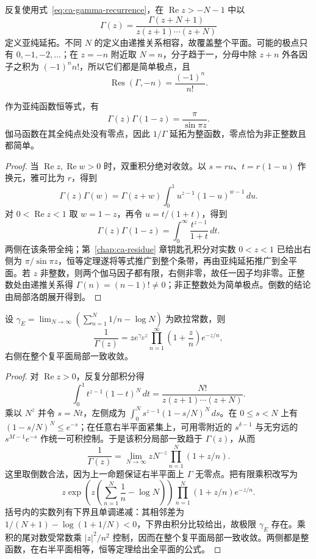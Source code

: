 反复使用式~\eqref{eq:ca-gamma-recurrence}，在 $\operatorname{Re}z>-N-1$ 中以
\[
 \Gamma(z)=\frac{\Gamma(z+N+1)}{z(z+1)\cdots(z+N)}
\]
定义亚纯延拓。不同 $N$ 的定义由递推关系相容，故覆盖整个平面。可能的极点只有 $0,-1,-2,\ldots$；在 $z=-n$ 附近取 $N=n$，分子趋于一，分母中除 $z+n$ 外各因子之积为 $(-1)^n n!$，所以它们都是简单极点，且
\begin{equation}
 \operatorname{Res}(\Gamma,-n)=\frac{(-1)^n}{n!}.
 \label{eq:ca-gamma-residues}
\end{equation}

\begin{proposition}[反射公式与无零点性]
\label{prop:ca-gamma-reflection}
作为亚纯函数恒等式，有
\begin{equation}
 \Gamma(z)\Gamma(1-z)=\frac{\pi}{\sin\pi z}.
 \label{eq:ca-gamma-reflection}
\end{equation}
伽马函数在其全纯点处没有零点，因此 $1/\Gamma$ 延拓为整函数，零点恰为非正整数且都简单。
\end{proposition}
\begin{proof}
当 $\operatorname{Re}z,\operatorname{Re}w>0$ 时，双重积分绝对收敛。以 $s=ru$、$t=r(1-u)$ 作换元，雅可比为 $r$，得到
\[
 \Gamma(z)\Gamma(w)=\Gamma(z+w)
 \int_0^1u^{z-1}(1-u)^{w-1}\,du.
\]
对 $0<\operatorname{Re}z<1$ 取 $w=1-z$，再令 $u=t/(1+t)$，得到
\[
 \Gamma(z)\Gamma(1-z)=\int_0^\infty\frac{t^{z-1}}{1+t}\,dt.
\]
两侧在该条带全纯；第~\ref{chap:ca-residue} 章钥匙孔积分对实数 $0<z<1$ 已给出右侧为 $\pi/\sin\pi z$，恒等定理遂将等式推广到整个条带，再由亚纯延拓推广到全平面。若 $z$ 非整数，则两个伽马因子都有限，右侧非零，故任一因子均非零。正整数处由递推关系得 $\Gamma(n)=(n-1)!\ne0$；非正整数处为简单极点。倒数的结论由局部洛朗展开得到。
\end{proof}

\begin{theorem}[伽马函数的魏尔斯特拉斯乘积]
\label{thm:ca-gamma-product}
设 $\gamma_E=\lim_{N\to\infty}(\sum_{n=1}^N1/n-\log N)$ 为欧拉常数，则
\begin{equation}
 \frac1{\Gamma(z)}=z e^{\gamma_E z}
 \prod_{n=1}^{\infty}\left(1+\frac zn\right)e^{-z/n},
 \label{eq:ca-gamma-product}
\end{equation}
右侧在整个复平面局部一致收敛。
\end{theorem}
\begin{proof}
对 $\operatorname{Re}z>0$，反复分部积分得
\[
 \int_0^1 t^{z-1}(1-t)^N\,dt
 =\frac{N!}{z(z+1)\cdots(z+N)}.
\]
乘以 $N^z$ 并令 $s=Nt$，左侧成为 $\int_0^N s^{z-1}(1-s/N)^N\,ds$。在 $0\le s<N$ 上有 $(1-s/N)^N\le e^{-s}$；在任意右半平面紧集上，可用零附近的 $s^{\delta-1}$ 与无穷远的 $s^{M-1}e^{-s}$ 作统一可积控制。于是该积分局部一致趋于 $\Gamma(z)$，从而
\[
 \frac1{\Gamma(z)}=
 \lim_{N\to\infty}zN^{-z}\prod_{n=1}^N(1+z/n).
\]
这里取倒数合法，因为上一命题保证右半平面上 $\Gamma$ 无零点。把有限乘积改写为
\[
 z\exp\left(z\left(\sum_{n=1}^N\frac1n-\log N\right)\right)
 \prod_{n=1}^N(1+z/n)e^{-z/n}.
\]
括号内的实数列有下界且单调递减：其相邻差为 $1/(N+1)-\log(1+1/N)<0$，下界由积分比较给出，故极限 $\gamma_E$ 存在。乘积的尾对数受常数乘 $|z|^2/n^2$ 控制，因而在整个复平面局部一致收敛。两侧都是整函数，在右半平面相等，恒等定理给出全平面的公式。
\end{proof}

